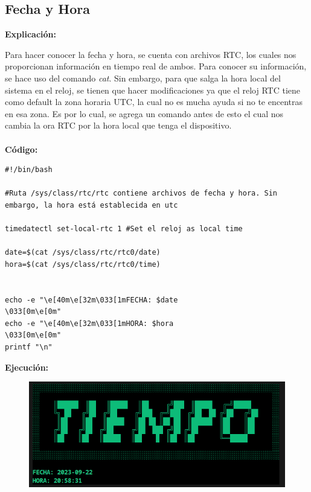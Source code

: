 \documentclass[letter,12pt]{article} %
\begin{document}
\subsection{Fecha y Hora}
\textbf{Explicación:} \par
\vspace{0.3cm}
Para hacer conocer la fecha y hora, se cuenta con archivos RTC, los cuales nos proporcionan información en tiempo real de ambos. Para conocer su información, se hace uso del comando \textit{cat}. Sin embargo, para que salga la hora local del sistema en el reloj, se tienen que hacer modificaciones ya que el reloj RTC tiene como default la zona horaria UTC, la cual no es mucha ayuda si no te encentras en esa zona. Es por lo cual, se agrega un comando antes de esto el cual nos cambia la ora RTC por la hora local que tenga el dispositivo.
\\\\
\textbf{Código:} \par
\begin{lstlisting}[style=BashInputStyle]
#!/bin/bash

#Ruta /sys/class/rtc/rtc contiene archivos de fecha y hora. Sin embargo, la hora está establecida en utc

timedatectl set-local-rtc 1 #Set el reloj as local time

date=$(cat /sys/class/rtc/rtc0/date)
hora=$(cat /sys/class/rtc/rtc0/time)


echo -e "\e[40m\e[32m\033[1mFECHA: $date                                                     \033[0m\e[0m" 
echo -e "\e[40m\e[32m\033[1mHORA: $hora                                                        \033[0m\e[0m" 
printf "\n"
\end{lstlisting}
\textbf{Ejecución:} \par
\begin{figure}[H]
	\centering
	\includegraphics[scale=0.7]{imagenes/time.png}
\end{figure}
\end{document}
